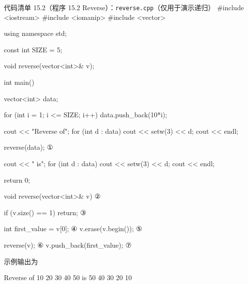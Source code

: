 \begin{codeboxt}{代码清单 15.2（程序 15.2 Reverse）：\texttt{reverse.\allowbreak{}cpp}（仅用于演示递归）}
#include <iostream>
#include <iomanip>
#include <vector>

using namespace std;

const int SIZE = 5;

void reverse(vector<int>& v);

int main()
{
    vector<int> data;

    for (int i = 1; i <= SIZE; i++) data.push_back(10*i);

    cout << "Reverse of";
    for (int d : data) cout << setw(3) << d;
    cout << endl;

    reverse(data);                        ①

    cout << "        is";
    for (int d : data) cout << setw(3) << d;
    cout << endl;

    return 0;
}

void reverse(vector<int>& v)               ②
{
    if (v.size() == 1) return;             ③

    int first_value = v[0];                ④
    v.erase(v.begin());                    ⑤

    reverse(v);                            ⑥
    v.push_back(first_value);              ⑦
}
\end{codeboxt}
\par
{}\par
{}\par
{}\par
{}\par
{}\par
{}\par

示例输出为

\begin{codebox}
Reverse of 10 20 30 40 50
        is 50 40 30 20 10
\end{codebox}


